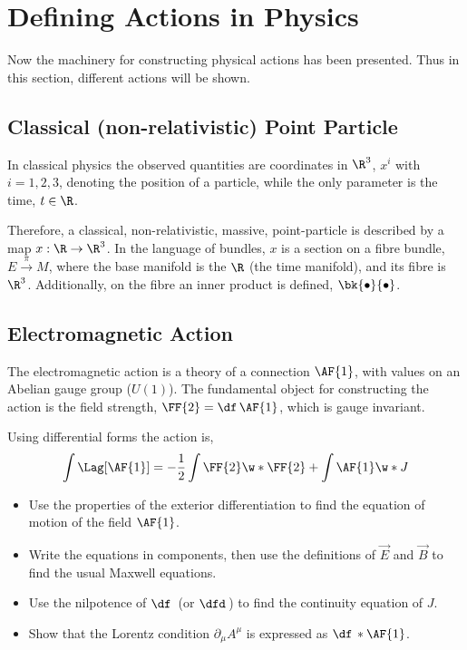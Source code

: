 \section{Defining Actions in Physics}

Now the machinery for constructing physical actions has been presented. Thus in this section, different actions will be shown.


\subsection{Classical (non-relativistic) Point Particle}

In classical physics the observed quantities are coordinates in $\R^3$, $x^i$ with $i=1,2,3$, denoting the position of a particle, while the only parameter is the time,  $t\in \R$.

Therefore, a classical, non-relativistic, massive, point-particle is described by a map $x:\R\to\R^3$. In the language of bundles, $x$ is a section on a fibre bundle, $E\xrightarrow{~\pi~}M$, where the base manifold is the $\R$ (the time manifold), and its fibre is $\R^3$. Additionally, on the fibre an inner product is defined, $\bk{\bullet}{\bullet}$.




\subsection{Electromagnetic Action}

The electromagnetic action is a theory of a connection $\AF{1}$, with values on an Abelian gauge group ($U(1)$). The fundamental object for constructing the action is the field strength, $\FF{2}=\df\,\AF{1}$, which is gauge invariant.

Using differential forms the action is,
\begin{align}
  \int\Lag[\AF{1}] = -\frac{1}{2}\int \FF{2}\w *\FF{2}+\int \AF{1}\w*J
\end{align}


\begin{Ebox}
  \begin{itemize}
  \item Use the properties of the exterior differentiation to find the equation of motion of the field $\AF{1}$.
  \item Write the equations in components, then use the definitions of $\vec{E}$ and $\vec{B}$ to find the usual Maxwell equations.
  \item Use the nilpotence of $\df\,$ (or $\dfd\,$) to find the continuity equation of $J$.
  \item Show that the Lorentz condition $\partial_\mu A^\mu$ is expressed as $\df\,*\AF{1}$.
  \end{itemize}
\end{Ebox}



